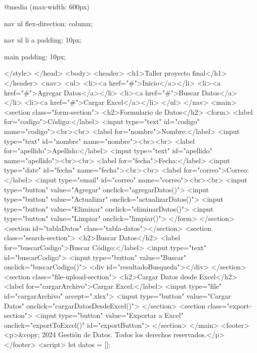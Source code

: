         @media (max-width: 600px) {
            nav ul {
                flex-direction: column;
            }

            nav ul li a {
                padding: 10px;
            }

            main {
                padding: 10px;
            }
        }
    </style>
</head>
<body>
    <header>
        <h1>Taller proyecto final</h1>
    </header>
    <nav>
        <ul>
            <li><a href="#">Inicio</a></li>
            <li><a href="#">Agregar Datos</a></li>
            <li><a href="#">Buscar Datos</a></li>
            <li><a href="#">Cargar Excel</a></li>
        </ul>
    </nav>
    <main>
        <section class="form-section">
            <h2>Formulario de Datos</h2>
            <form>
                <label for="codigo">Código:</label>
                <input type="text" id="codigo" name="codigo"><br><br>
                <label for="nombre">Nombre:</label>
                <input type="text" id="nombre" name="nombre"><br><br>
                <label for="apellido">Apellido:</label>
                <input type="text" id="apellido" name="apellido"><br><br>
                <label for="fecha">Fecha:</label>
                <input type="date" id="fecha" name="fecha"><br><br>
                <label for="correo">Correo:</label>
                <input type="email" id="correo" name="correo"><br><br>
                <input type="button" value="Agregar" onclick="agregarDatos()">
                <input type="button" value="Actualizar" onclick="actualizarDatos()">
                <input type="button" value="Eliminar" onclick="eliminarDatos()">
                <input type="button" value="Limpiar" onclick="limpiar()">
            </form>
        </section>
        <section id="tablaDatos" class="tabla-datos"></section>
        <section class="search-section">
            <h2>Buscar Datos</h2>
            <label for="buscarCodigo">Buscar Código:</label>
            <input type="text" id="buscarCodigo">
            <input type="button" value="Buscar" onclick="buscarCodigo()">
            <div id="resultadoBusqueda"></div>
        </section>
        <section class="file-upload-section">
            <h2>Cargar Datos desde Excel</h2>
            <label for="cargarArchivo">Cargar Excel:</label>
            <input type="file" id="cargarArchivo" accept=".xlsx">
            <input type="button" value="Cargar Datos" onclick="cargarDatosDesdeExcel()">
        </section>
        <section class="export-section">
            <input type="button" value="Exportar a Excel" onclick="exportToExcel()" id="exportButton">
        </section>
    </main>
    <footer>
        <p>&copy; 2024 Gestión de Datos. Todos los derechos reservados.</p>
    </footer>
    <script>
        let datos = [];

